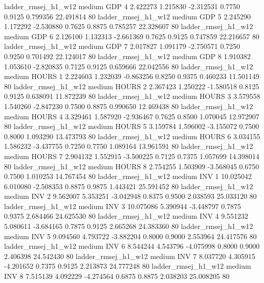    ladder_rmsej_h1_w12     medium      GDP                 4  2.422273 1.215830 -2.312531 0.7750 0.9125  0.799356   22.491814 80
   ladder_rmsej_h1_w12     medium      GDP                 5  2.245290 1.172292 -2.530880 0.7625 0.8875  0.785257   22.328607 80
   ladder_rmsej_h1_w12     medium      GDP                 6  2.126100 1.132313 -2.661369 0.7625 0.9125  0.747859   22.216657 80
   ladder_rmsej_h1_w12     medium      GDP                 7  2.017827 1.091179 -2.750571 0.7250 0.9250  0.701492   22.124017 80
   ladder_rmsej_h1_w12     medium      GDP                 8  1.910382 1.053610 -2.820835 0.7125 0.9125  0.659666   22.042556 80
   ladder_rmsej_h1_w12     medium    HOURS                 1  2.224603 1.232039 -0.863256 0.8250 0.9375  0.460233   11.501149 80
   ladder_rmsej_h1_w12     medium    HOURS                 2  2.367423 1.250222 -1.580518 0.8125 0.9125  0.638091   11.872239 80
   ladder_rmsej_h1_w12     medium    HOURS                 3  3.579558 1.540260 -2.847230 0.7500 0.8875  0.990650   12.469438 80
   ladder_rmsej_h1_w12     medium    HOURS                 4  3.329461 1.587920 -2.936467 0.7625 0.8500  1.070045   12.972907 80
   ladder_rmsej_h1_w12     medium    HOURS                 5  3.159784 1.596002 -3.155072 0.7500 0.8000  1.093290   13.473793 80
   ladder_rmsej_h1_w12     medium    HOURS                 6  3.034155 1.586232 -3.437755 0.7250 0.7750  1.089164   13.961591 80
   ladder_rmsej_h1_w12     medium    HOURS                 7  2.904132 1.552915 -3.500225 0.7125 0.7375  1.057699   14.398014 80
   ladder_rmsej_h1_w12     medium    HOURS                 8  2.754255 1.503909 -3.568045 0.6750 0.7500  1.010253   14.767454 80
   ladder_rmsej_h1_w12     medium      INV                 1 10.025042 6.010080 -2.508353 0.8875 0.9875  1.443421   25.591452 80
   ladder_rmsej_h1_w12     medium      INV                 2  9.562007 5.353251 -3.042948 0.8375 0.9500  2.038593   25.033120 80
   ladder_rmsej_h1_w12     medium      INV                 3 10.075086 5.390944 -3.448797 0.7875 0.9375  2.684466   24.625530 80
   ladder_rmsej_h1_w12     medium      INV                 4  9.551232 5.080611 -3.684165 0.7875 0.9125  2.665268   24.383360 80
   ladder_rmsej_h1_w12     medium      INV                 5  9.094560 4.793722 -3.882204 0.8000 0.9000  2.553964   24.417576 80
   ladder_rmsej_h1_w12     medium      INV                 6  8.544244 4.543796 -4.075998 0.8000 0.9000  2.406398   24.542430 80
   ladder_rmsej_h1_w12     medium      INV                 7  8.037720 4.305915 -4.201652 0.7375 0.9125  2.213873   24.777248 80
   ladder_rmsej_h1_w12     medium      INV                 8  7.515139 4.092229 -4.274564 0.6875 0.8875  2.038203   25.008205 80
